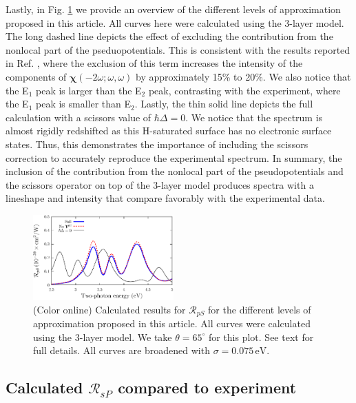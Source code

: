 \documentclass[prb,superscriptaddress,showpacs,twocolumn,letterpaper]{revtex4}
\begin{document}
Lastly, in Fig. \ref{fig:improvements} we provide an overview of the different
levels of approximation proposed in this article. All curves here were
calculated using the 3-layer model. The long dashed line depicts
the effect of excluding the contribution from the nonlocal part of the
pseduopotentials. This is consistent with the results reported in Ref.
, where the exclusion of this term increases the
intensity of the components of $\boldsymbol{\chi}(-2\omega;\omega,\omega)$ by
approximately 15\% to 20\%. We also notice that the E$_{1}$ peak is larger than
the E$_{2}$ peak, contrasting with the experiment, where the E$_{1}$ peak is
smaller than E$_{2}$. Lastly, the thin solid line depicts the full calculation
with a scissors value of $\hbar\Delta = 0$. We notice that the spectrum is
almost rigidly redshifted as this H-saturated surface has no electronic surface
states.\cite{andersonPRB15} Thus, this demonstrates the importance of including
the scissors correction to accurately reproduce the experimental spectrum. In
summary, the inclusion of the contribution from the nonlocal part of the
pseudopotentials and the scissors operator on top of the 3-layer model produces
spectra with a lineshape and intensity that compare favorably with the
experimental data.

\begin{figure}[t]
\centering
\includegraphics[width=0.48\textwidth]{plots/fig5}
\caption{(Color online) Calculated results for $\mathcal{R}_{pS}$ for the
different levels of approximation proposed in this article. All curves were
calculated using the 3-layer model. We take $\theta=65^{\circ}$ for this plot.
See text for full details. All curves are broadened with
$\sigma=0.075\,\text{eV}$.
\label{fig:improvements}}
\end{figure}


\subsection{Calculated \texorpdfstring{$\mathcal{R}_{sP}$}{RsP} compared to
experiment}\label{sec:RsP}
\end{document}
